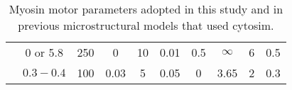 \begin{sidewaystable}
\begin{minipage}[c][\textheight][c]{\textwidth}
\begin{center}
\begin{tabular}{lcccccccccc}
				\multicolumn{2}{l}{\cite{Ding2017}} & 0 or 5.8 & 250 & 0 & 10 & 0.01 & 0.5 & $\infty$ & 6 & 0.5 \\
				
				\multicolumn{2}{l}{\cite{Ennomani2016}} & $0.3 - 0.4$ & 100 & 0.03 & 5 & 0.05 & 0 & 3.65 & 2 & 0.3 \\
				
			\end{tabular}
		\end{center}
			\caption{Myosin motor parameters adopted in this study and in previous microstructural models that used cytosim.}
		\label{tab:MotorParamTable}
	\end{minipage}
\end{sidewaystable}

\hspace{1cm}





	
	

